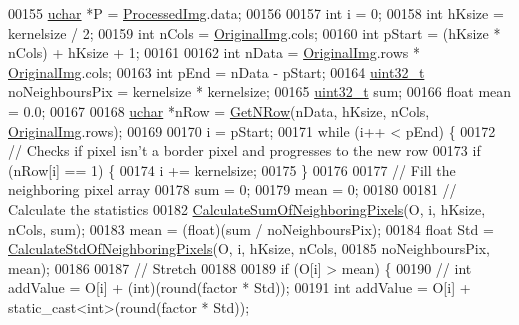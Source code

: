 \begin{DoxyCode}
00155   \hyperlink{_soil_math_types_8h_a65f85814a8290f9797005d3b28e7e5fc}{uchar} *P = \hyperlink{class_vision_1_1_image_processing_aa7d65742882cd1b2a1e4e9cb68809211}{ProcessedImg}.data;
00156 
00157   \textcolor{keywordtype}{int} i = 0;
00158   \textcolor{keywordtype}{int} hKsize = kernelsize / 2;
00159   \textcolor{keywordtype}{int} nCols = \hyperlink{class_vision_1_1_image_processing_a77c370dab270158a4e9c634e2d3f48e7}{OriginalImg}.cols;
00160   \textcolor{keywordtype}{int} pStart = (hKsize * nCols) + hKsize + 1;
00161 
00162   \textcolor{keywordtype}{int} nData = \hyperlink{class_vision_1_1_image_processing_a77c370dab270158a4e9c634e2d3f48e7}{OriginalImg}.rows * \hyperlink{class_vision_1_1_image_processing_a77c370dab270158a4e9c634e2d3f48e7}{OriginalImg}.cols;
00163   \textcolor{keywordtype}{int} pEnd = nData - pStart;
00164   \hyperlink{_soil_math_types_8h_a435d1572bf3f880d55459d9805097f62}{uint32\_t} noNeighboursPix = kernelsize * kernelsize;
00165   \hyperlink{_soil_math_types_8h_a435d1572bf3f880d55459d9805097f62}{uint32\_t} sum;
00166   \textcolor{keywordtype}{float} mean = 0.0;
00167 
00168   \hyperlink{_soil_math_types_8h_a65f85814a8290f9797005d3b28e7e5fc}{uchar} *nRow = \hyperlink{class_vision_1_1_image_processing_a56e17515a15eb7d246985e550fc89610}{GetNRow}(nData, hKsize, nCols, \hyperlink{class_vision_1_1_image_processing_a77c370dab270158a4e9c634e2d3f48e7}{OriginalImg}.rows);
00169 
00170   i = pStart;
00171   \textcolor{keywordflow}{while} (i++ < pEnd) \{
00172     \textcolor{comment}{// Checks if pixel isn't a border pixel and progresses to the new row}
00173     \textcolor{keywordflow}{if} (nRow[i] == 1) \{
00174       i += kernelsize;
00175     \}
00176 
00177     \textcolor{comment}{// Fill the neighboring pixel array}
00178     sum = 0;
00179     mean = 0;
00180 
00181     \textcolor{comment}{// Calculate the statistics}
00182     \hyperlink{class_vision_1_1_enhance_a6ff043acf8f40873141ef3bb0af4994d}{CalculateSumOfNeighboringPixels}(O, i, hKsize, nCols, sum);
00183     mean = (float)(sum / noNeighboursPix);
00184     \textcolor{keywordtype}{float} Std = \hyperlink{class_vision_1_1_enhance_ac03740bd6b3cd2936a579644c9646ce0}{CalculateStdOfNeighboringPixels}(O, i, hKsize, nCols,
00185                                                 noNeighboursPix, mean);
00186 
00187     \textcolor{comment}{// Stretch}
00188 
00189     \textcolor{keywordflow}{if} (O[i] > mean) \{
00190       \textcolor{comment}{// int addValue = O[i] + (int)(round(factor * Std));}
00191       \textcolor{keywordtype}{int} addValue = O[i] + \textcolor{keyword}{static\_cast<}\textcolor{keywordtype}{int}\textcolor{keyword}{>}(round(factor * Std));

\end{DoxyCode}
